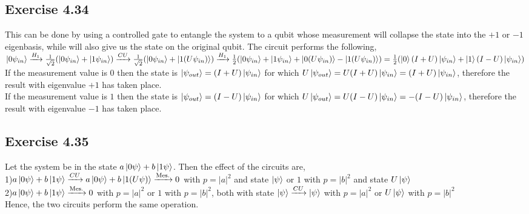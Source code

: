 \documentclass[a4paper,12pt]{article}
\begin{document}
\subsection*{Exercise 4.34}
This can be done by using a controlled gate to entangle the system to 
a qubit whose measurement will collapse the state into the $+1$ or $-1$
eigenbasis, while will also give us the state on the original qubit.
The circuit performs the following,\\
$\ket{0\psi_{in}}\xrightarrow{H_1}\frac{1}{\sqrt{2}}
(\ket{0\psi_{in}}+\ket{1\psi_{in}})\xrightarrow{CU}
\frac{1}{\sqrt{2}}(\ket{0\psi_{in}}+\ket{1(U\psi_{in})})\xrightarrow{H_1}
\frac{1}{2}(\ket{0\psi_{in}}+\ket{1\psi_{in}}+\ket{0(U\psi_{in})}-\ket{1(U\psi_{in})})=
\frac{1}{2}(\ket{0}(I+U)\ket{\psi_{in}}+\ket{1}(I-U)\ket{\psi_{in}})$\\
If the measurement value is $0$ then the state is 
$\ket{\psi_{out}}=(I+U)\ket{\psi_{in}}$ for which
$U\ket{\psi_{out}}=U(I+U)\ket{\psi_{in}}=(I+U)\ket{\psi_{in}}$,
therefore the result with eigenvalue $+1$ has taken place.\\
If the measurement value is $1$ then the state is
$\ket{\psi_{out}}=(I-U)\ket{\psi_{in}}$ for which
$U\ket{\psi_{out}}=U(I-U)\ket{\psi_{in}}=-(I-U)\ket{\psi_{in}}$,
therefore the result with eigenvalue $-1$ has taken place.
\subsection*{Exercise 4.35}
Let the system be in the state $a\ket{0\psi}+b\ket{1\psi}$. Then
the effect of the circuits are,\\
1)$a\ket{0\psi}+b\ket{1\psi}\xrightarrow{CU} 
a\ket{0\psi}+b\ket{1(U\psi)}\xrightarrow{\text{Mes.}}
0$ with $p=|a|^2$ and state $\ket{\psi}$ or $1$ with
$p=|b|^2$ and state $U\ket{\psi}$\\
2)$a\ket{0\psi}+b\ket{1\psi}\xrightarrow{\text{Mes.}}
0$ with $p=|a|^2$ or $1$ with
$p=|b|^2$, both with state $\ket{\psi}\xrightarrow{CU}
\ket{\psi}$ with $p=|a|^2$ or $U\ket{\psi}$ with
$p=|b|^2$\\
Hence, the two circuits perform the same operation.
\end{document}
